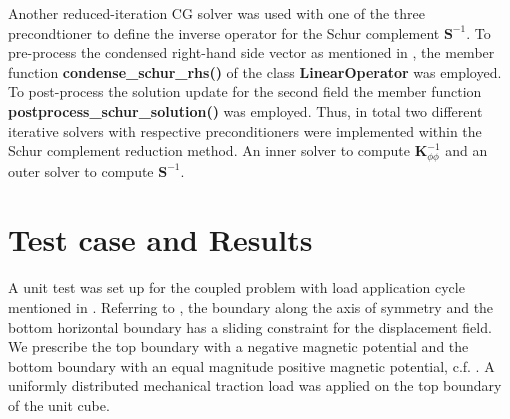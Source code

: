 \documentclass[11pt,a4paper,final]{article}
\begin{document}
Another reduced-iteration CG solver was used with one of the three precondtioner to define the inverse operator for the Schur complement $\mathbf{S}^{-1}$. To pre-process the condensed right-hand side vector as mentioned in , the member function \textbf{condense\_schur_rhs()} of the class \textbf{LinearOperator} was employed. To post-process the solution update for the second field the member function \textbf{postprocess\_schur_solution()} was employed. Thus, in total two different iterative solvers with respective preconditioners were implemented within the Schur complement reduction method. An inner solver to compute $\mathbf{K}_{\phi \phi}^{-1}$ and an outer solver to compute $\mathbf{S}^{-1}$.

\section{Test case and Results}
\label{sec:unit_test_coup}
A unit test was set up for the coupled problem with load application cycle mentioned in . Referring to , the boundary along the axis of symmetry and the bottom horizontal boundary has a sliding constraint for the displacement field. We prescribe the top boundary with a negative magnetic potential and the bottom boundary with an equal magnitude positive magnetic potential, c.f. . A uniformly distributed mechanical traction load was applied on the top boundary of the unit cube. \par 
\end{document}
